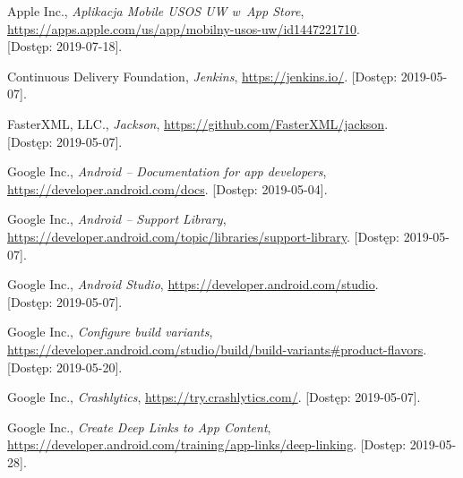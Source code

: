 \documentclass{pracamgr}
\begin{document}
\appendix

\cleardoublepage
{}
{}
\listoffigures

\cleardoublepage
{}
{}
\listoftables


\begin{thebibliography}{99}


 Apple Inc.,
\textit{Aplikacja Mobile USOS UW w~App Store},\\
\url{https://apps.apple.com/us/app/mobilny-usos-uw/id1447221710}.\\
{[Dostęp: 2019-07-18]}.


 Continuous Delivery Foundation, \textit{Jenkins},
\url{https://jenkins.io/}. [Dostęp: 2019-05-07].


 FasterXML, LLC., \textit{Jackson},
\url{https://github.com/FasterXML/jackson}.\\
{[Dostęp: 2019-05-07]}.


 Google Inc., \textit{Android -- Documentation for app developers},
\url{https://developer.android.com/docs}. [Dostęp: 2019-05-04].

 Google Inc., \textit{Android -- Support Library},
\url{https://developer.android.com/topic/libraries/support-library}. [Dostęp: 2019-05-07].

 Google Inc., \textit{Android Studio},
\url{https://developer.android.com/studio}. \\ 
{[Dostęp: 2019-05-07]}.

 Google Inc., \textit{Configure build variants}, \url{https://developer.android.com/studio/build/build-variants#product-flavors}. [Dostęp: 2019-05-20].

 Google Inc., \textit{Crashlytics}, \url{https://try.crashlytics.com/}. [Dostęp: 2019-05-07].

 Google Inc., \textit{Create Deep Links to App Content}, \url{https://developer.android.com/training/app-links/deep-linking}. [Dostęp: 2019-05-28].


\end{thebibliography}
\end{document}
